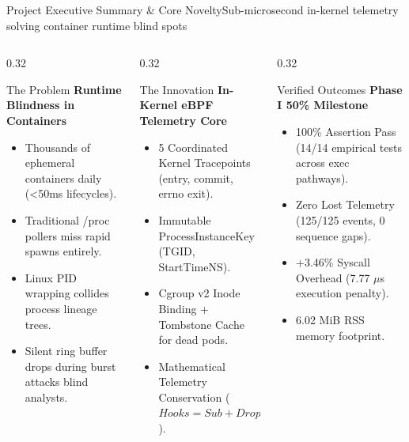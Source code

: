 \documentclass[aspectratio=169,10pt]{beamer}
\begin{document}
\begin{frame}{Project Executive Summary \& Core Novelty}{Sub-microsecond in-kernel telemetry solving container runtime blind spots}
  \begin{columns}[T]
    \begin{column}{0.32\textwidth}
      \begin{alertblock}{The Problem}
        \scriptsize
        \textbf{Runtime Blindness in Containers}
        \begin{itemize}
          \item Thousands of ephemeral containers daily (<50ms lifecycles).
          \item Traditional /proc pollers miss rapid spawns entirely.
          \item Linux PID wrapping collides process lineage trees.
          \item Silent ring buffer drops during burst attacks blind analysts.
        \end{itemize}
      \end{alertblock}
    \end{column}

    \begin{column}{0.32\textwidth}
      \begin{block}{The Innovation}
        \scriptsize
        \textbf{In-Kernel eBPF Telemetry Core}
        \begin{itemize}
          \item 5 Coordinated Kernel Tracepoints (entry, commit, errno exit).
          \item Immutable ProcessInstanceKey (TGID, StartTimeNS).
          \item Cgroup v2 Inode Binding + Tombstone Cache for dead pods.
          \item Mathematical Telemetry Conservation ($Hooks = Sub + Drop$).
        \end{itemize}
      \end{block}
    \end{column}

    \begin{column}{0.32\textwidth}
      \begin{exampleblock}{Verified Outcomes}
        \scriptsize
        \textbf{Phase I 50\% Milestone}
        \begin{itemize}
          \item 100\% Assertion Pass (14/14 empirical tests across exec pathways).
          \item Zero Lost Telemetry (125/125 events, 0 sequence gaps).
          \item +3.46\% Syscall Overhead (7.77 $\mu$s execution penalty).
          \item 6.02 MiB RSS memory footprint.
        \end{itemize}
      \end{exampleblock}
    \end{column}
  \end{columns}
\end{frame}
\end{document}
